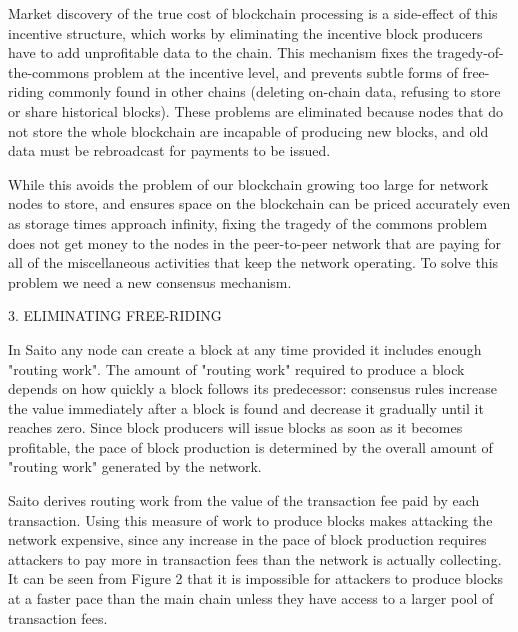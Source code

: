 \documentclass[11pt, oneside]{article}   	%
\begin{document}
\begin{multicols}{2}
Market discovery of the true cost of blockchain processing is a side-effect of this incentive structure, which works by eliminating the incentive block producers have to add unprofitable data to the chain. This mechanism fixes the tragedy-of-the-commons problem at the incentive level, and prevents subtle forms of free-riding commonly found in other chains (deleting on-chain data, refusing to store or share historical blocks). These problems are eliminated because nodes that do not store the whole blockchain are incapable of producing new blocks, and old data must be rebroadcast for payments to be issued.

While this avoids the problem of our blockchain growing too large for network nodes to store, and ensures space on the blockchain can be priced accurately even as storage times approach infinity, fixing the tragedy of the commons problem does not get money to the nodes in the peer-to-peer network that are paying for all of the miscellaneous activities that keep the network operating. To solve this problem we need a new consensus mechanism.


3. ELIMINATING FREE-RIDING

In Saito any node can create a block at any time provided it includes enough "routing work". The amount of "routing work" required to produce a block depends on how quickly a block follows its predecessor: consensus rules increase the value immediately after a block is found and decrease it gradually until it reaches zero. Since block producers will issue blocks as soon as it becomes profitable, the pace of block production is determined by the overall amount of "routing work" generated by the network.

{}

Saito derives routing work from the value of the transaction fee paid by each transaction. Using this measure of work to produce blocks makes attacking the network expensive, since any increase in the pace of block production requires attackers to pay more in transaction fees than the network is actually collecting. It can be seen from Figure 2 that it is impossible for attackers to produce blocks at a faster pace than the main chain unless they have access to a larger pool of transaction fees.


\end{multicols}
\end{document}
